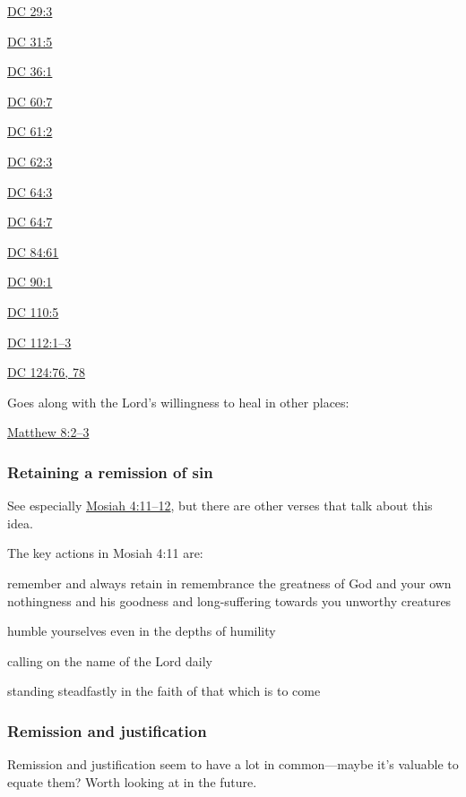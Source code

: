			\begin{compactitem}
				\item \hyperref[DC29-3]{DC 29:3}
				\item \hyperref[DC31-5]{DC 31:5}
				\item \hyperref[DC36-1]{DC 36:1}
				\item \hyperref[DC60-7]{DC 60:7}
				\item \hyperref[DC61-2]{DC 61:2}
				\item \hyperref[DC62-3]{DC 62:3}
				\item \hyperref[DC64-3]{DC 64:3}
				\item \hyperref[DC64-7]{DC 64:7}
				\item \hyperref[DC84-61]{DC 84:61}
				\item \hyperref[DC90-1]{DC 90:1}
				\item \hyperref[DC110-5]{DC 110:5}
				\item \hyperref[DC112-1]{DC 112:1--3}
				\item \hyperref[DC124-76]{DC 124:76, 78}
			\end{compactitem}
			
		Goes along with the Lord's willingness to heal in other places:
		
			\begin{compactitem}
				\item \hyperref[MATTHEW-8-2]{Matthew 8:2--3}
			\end{compactitem}
		
	\subsubsection{Retaining a remission of sin}
		\label{REMISSION-retaining}
		
		See especially \hyperref[MOSIAH-4-11]{Mosiah 4:11--12}, but there are other verses that talk about this idea.
		
		The key actions in Mosiah 4:11 are:
		
			\begin{compactitem}
				\item remember and always retain in remembrance the greatness of God and your own nothingness and his goodness and long-suffering towards you unworthy creatures
				\item humble yourselves even in the depths of humility
				\item calling on the name of the Lord daily
				\item standing steadfastly in the faith of that which is to come
			\end{compactitem}
		
	\subsubsection{Remission and justification}
		\label{REMISSION-justification}
		
		Remission and justification seem to have a lot in common---maybe it's valuable to equate them? Worth looking at in the future.
